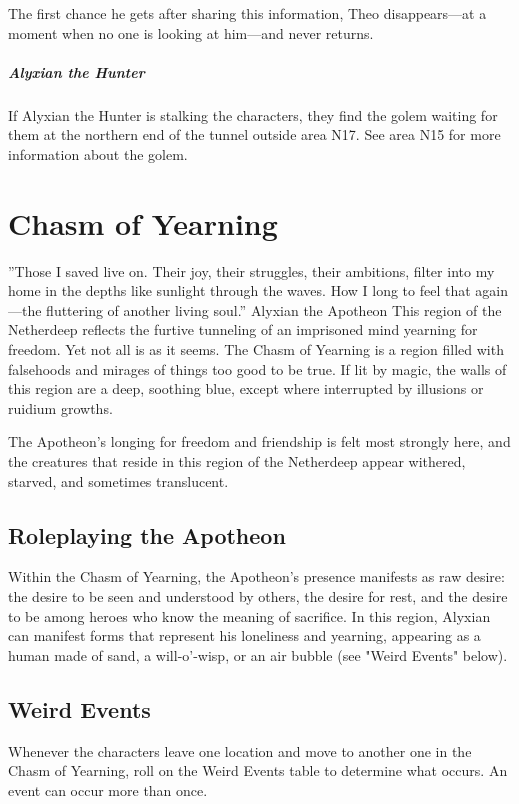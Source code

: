 \documentclass[10pt,a4paper,twoside,fancy,bg=print,twocolumn,openany,nodeprecatedcode]{dndbook}
\begin{document}
The first chance he gets after sharing this information, Theo disappears—at a moment when no one is looking at him—and never returns.

\subparagraph{Alyxian the Hunter}
If Alyxian the Hunter is stalking the characters, they find the golem waiting for them at the northern end of the tunnel outside area N17. See area N15 for more information about the golem.

\section{Chasm of Yearning}
\DndQuote%
{}
{''Those I saved live on. Their joy, their struggles, their ambitions, filter into my home in the depths like sunlight through the waves. How I long to feel that again—the fluttering of another living soul.''}
{Alyxian the Apotheon}
This region of the Netherdeep reflects the furtive tunneling of an imprisoned mind yearning for freedom. Yet not all is as it seems. The Chasm of Yearning is a region filled with falsehoods and mirages of things too good to be true. If lit by magic, the walls of this region are a deep, soothing blue, except where interrupted by illusions or ruidium growths.

The Apotheon's longing for freedom and friendship is felt most strongly here, and the creatures that reside in this region of the Netherdeep appear withered, starved, and sometimes translucent.

\subsection{Roleplaying the Apotheon}
Within the Chasm of Yearning, the Apotheon's presence manifests as raw desire: the desire to be seen and understood by others, the desire for rest, and the desire to be among heroes who know the meaning of sacrifice. In this region, Alyxian can manifest forms that represent his loneliness and yearning, appearing as a human made of sand, a will-o'-wisp, or an air bubble (see "Weird Events" below).

\subsection{Weird Events}
Whenever the characters leave one location and move to another one in the Chasm of Yearning, roll on the Weird Events table to determine what occurs. An event can occur more than once.
\end{document}
